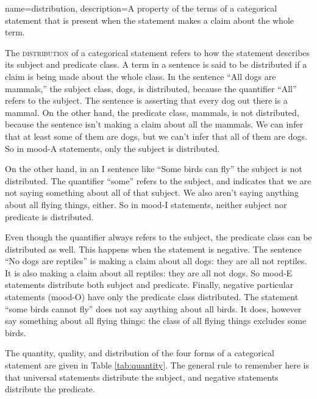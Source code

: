 {
name=distribution,
description={A property of the terms of a categorical statement that is present when the statement makes a claim about the whole term.}
}

The \textsc{\gls{distribution}} of a categorical statement refers to how the statement describes its subject and predicate class. A term in a sentence is said to be distributed \label{def:Distribution} if a claim is being made about the whole class. In the sentence ``All dogs are mammals,'' the subject class, dogs, is distributed, because the quantifier ``All'' refers to the subject. The sentence is asserting that every dog out there is a mammal. On the other hand, the predicate class, mammals, is not distributed, because the sentence isn't making a claim about all the mammals. We can infer that at least some of them are dogs, but we can't infer that all of them are dogs. So in mood-A statements, only the subject is distributed. 

On the other hand, in an I sentence like ``Some birds can fly'' the subject is not distributed. The quantifier ``some'' refers to the subject, and indicates that we are not saying something about all of that subject. We also aren't saying anything about all flying things, either. So in mood-I statements, neither subject nor predicate is distributed. 

Even though the quantifier always refers to the subject, the predicate class can be distributed as well. This happens when the statement is negative. The sentence ``No dogs are reptiles'' is making a claim about all dogs: they are all not reptiles. It is also making a claim about all reptiles: they are all not dogs. So mood-E statements distribute both subject and predicate. Finally, negative particular statements (mood-O) have only the predicate class distributed. The statement ``some birds cannot fly'' does not say anything about all birds. It does, however say something about all flying things: the class of all flying things excludes some birds. 

The quantity, quality, and distribution of the four forms of a categorical statement are given in Table \ref{tab:quantity}. The general rule to remember here is that universal statements distribute the subject, and negative statements distribute the predicate. 



